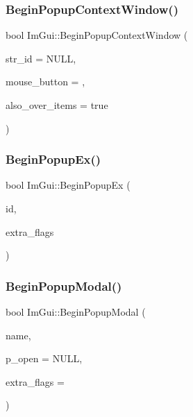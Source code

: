 \mbox{\label{namespace_im_gui_acf98c99f041ea341d0328e071c56411b}} 
\subsubsection{\texorpdfstring{Begin\+Popup\+Context\+Window()}{BeginPopupContextWindow()}}
{\footnotesize\ttfamily bool Im\+Gui\+::\+Begin\+Popup\+Context\+Window (\begin{DoxyParamCaption}\item[{const char $\ast$}]{str\+\_\+id = {\ttfamily NULL},  }\item[{int}]{mouse\+\_\+button = {},  }\item[{bool}]{also\+\_\+over\+\_\+items = {\ttfamily true} }\end{DoxyParamCaption})}

\mbox{\label{namespace_im_gui_a89da3a22300e8293257b6cfdf1b83b7a}} 
\subsubsection{\texorpdfstring{Begin\+Popup\+Ex()}{BeginPopupEx()}}
{\footnotesize\ttfamily bool Im\+Gui\+::\+Begin\+Popup\+Ex (\begin{DoxyParamCaption}\item[{\mbox{\hyperlink{imgui_8h_a1785c9b6f4e16406764a85f32582236f}{Im\+Gui\+ID}}}]{id,  }\item[{\mbox{\hyperlink{imgui_8h_a0b8e067ab4f7a818828c8d89e531addc}{Im\+Gui\+Window\+Flags}}}]{extra\+\_\+flags }\end{DoxyParamCaption})}

\mbox{\label{namespace_im_gui_aa70aaf1dacf5702f85feca6f729a307a}} 
\subsubsection{\texorpdfstring{Begin\+Popup\+Modal()}{BeginPopupModal()}}
{\footnotesize\ttfamily bool Im\+Gui\+::\+Begin\+Popup\+Modal (\begin{DoxyParamCaption}\item[{const char $\ast$}]{name,  }\item[{bool $\ast$}]{p\+\_\+open = {\ttfamily NULL},  }\item[{\mbox{\hyperlink{imgui_8h_a0b8e067ab4f7a818828c8d89e531addc}{Im\+Gui\+Window\+Flags}}}]{extra\+\_\+flags = {} }\end{DoxyParamCaption})}

